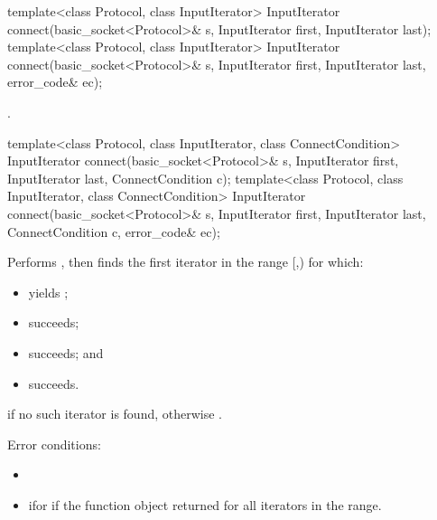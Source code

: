 \begin{itemdecl}
template<class Protocol, class InputIterator>
  InputIterator connect(basic_socket<Protocol>& s,
                        InputIterator first, InputIterator last);
template<class Protocol, class InputIterator>
  InputIterator connect(basic_socket<Protocol>& s,
                        InputIterator first, InputIterator last,
                        error_code& ec);
\end{itemdecl}

\begin{itemdescr}
\pnum
\returns {}.
\end{itemdescr}

\begin{itemdecl}
template<class Protocol, class InputIterator, class ConnectCondition>
  InputIterator connect(basic_socket<Protocol>& s,
                        InputIterator first, InputIterator last,
                        ConnectCondition c);
template<class Protocol, class InputIterator, class ConnectCondition>
  InputIterator connect(basic_socket<Protocol>& s,
                        InputIterator first, InputIterator last,
                        ConnectCondition c, error_code& ec);
\end{itemdecl}

\begin{itemdescr}
\pnum
\effects Performs , then finds the first iterator  in the range [,) for which:
\begin{itemize}
\item
{}yields ;
\item
{}succeeds;
\item
{}succeeds; and
\item
{} succeeds.
\end{itemize}

\pnum
\returns {} if no such iterator is found, otherwise .

\pnum
Error conditions: 
\begin{itemize}
\item
{}
\item
 ifor if the function object returned  for all iterators in the range.
\end{itemize}
\end{itemdescr}



